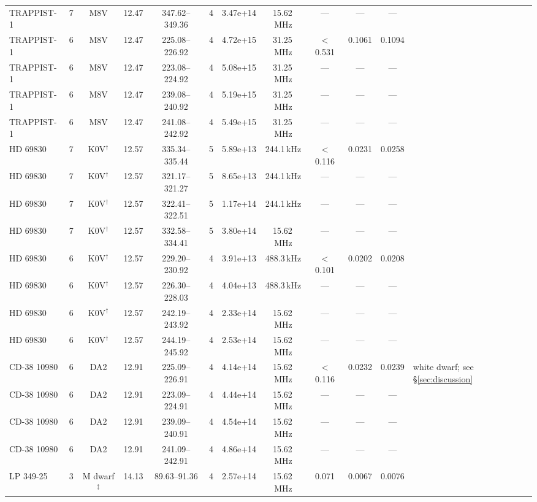 \documentclass{openjournal}
\begin{document}
\begin{table}
\begin{tabularx}{\textwidth}{@{}l c c c c c c c c c c X@{}}
 TRAPPIST-1 & 7 & M8V & 12.47 & 347.62--349.36 & 4 & 3.47e+14 & 15.62\,MHz & --- & --- & --- &  \\
 TRAPPIST-1 & 6 & M8V & 12.47 & 225.08--226.92 & 4 & 4.72e+15 & 31.25\,MHz & $<$0.531 & 0.1061 & 0.1094 &  \\
 TRAPPIST-1 & 6 & M8V & 12.47 & 223.08--224.92 & 4 & 5.08e+15 & 31.25\,MHz & --- & --- & --- &  \\
 TRAPPIST-1 & 6 & M8V & 12.47 & 239.08--240.92 & 4 & 5.19e+15 & 31.25\,MHz & --- & --- & --- &  \\
 TRAPPIST-1 & 6 & M8V & 12.47 & 241.08--242.92 & 4 & 5.49e+15 & 31.25\,MHz & --- & --- & --- &  \\
 HD 69830 & 7 & K0V$^\dagger$ & 12.57 & 335.34--335.44 & 5 & 5.89e+13 & 244.1\,kHz & $<$0.116 & 0.0231 & 0.0258 &  \\
 HD 69830 & 7 & K0V$^\dagger$ & 12.57 & 321.17--321.27 & 5 & 8.65e+13 & 244.1\,kHz & --- & --- & --- &  \\
 HD 69830 & 7 & K0V$^\dagger$ & 12.57 & 322.41--322.51 & 5 & 1.17e+14 & 244.1\,kHz & --- & --- & --- &  \\
 HD 69830 & 7 & K0V$^\dagger$ & 12.57 & 332.58--334.41 & 5 & 3.80e+14 & 15.62\,MHz & --- & --- & --- &  \\
 HD 69830 & 6 & K0V$^\dagger$ & 12.57 & 229.20--230.92 & 4 & 3.91e+13 & 488.3\,kHz & $<$0.101 & 0.0202 & 0.0208 &  \\
 HD 69830 & 6 & K0V$^\dagger$ & 12.57 & 226.30--228.03 & 4 & 4.04e+13 & 488.3\,kHz & --- & --- & --- &  \\
 HD 69830 & 6 & K0V$^\dagger$ & 12.57 & 242.19--243.92 & 4 & 2.33e+14 & 15.62\,MHz & --- & --- & --- &  \\
 HD 69830 & 6 & K0V$^\dagger$ & 12.57 & 244.19--245.92 & 4 & 2.53e+14 & 15.62\,MHz & --- & --- & --- &  \\
 CD-38 10980 & 6 & DA2 & 12.91 & 225.09--226.91 & 4 & 4.14e+14 & 15.62\,MHz & $<$0.116 & 0.0232 & 0.0239 & white dwarf; see \S\ref{sec:discussion} \\
 CD-38 10980 & 6 & DA2 & 12.91 & 223.09--224.91 & 4 & 4.44e+14 & 15.62\,MHz & --- & --- & --- &  \\
 CD-38 10980 & 6 & DA2 & 12.91 & 239.09--240.91 & 4 & 4.54e+14 & 15.62\,MHz & --- & --- & --- &  \\
 CD-38 10980 & 6 & DA2 & 12.91 & 241.09--242.91 & 4 & 4.86e+14 & 15.62\,MHz & --- & --- & --- &  \\
 LP  349-25 & 3 & M dwarf$^\ddagger$ & 14.13 & 89.63--91.36 & 4 & 2.57e+14 & 15.62\,MHz & 0.071 & 0.0067 & 0.0076 &  \\
\hline
\end{tabularx}
\end{table}
\end{document}
